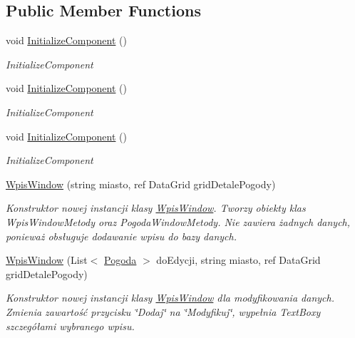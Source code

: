 \subsection*{Public Member Functions}
\begin{DoxyCompactItemize}
\item 
void \mbox{\hyperlink{class_projekt_1_1_wpis_window_a88a28d6acd2b4dc8de2f1272c9c23f8d}{Initialize\+Component}} ()
\begin{DoxyCompactList}\small\item\em Initialize\+Component \end{DoxyCompactList}\item 
void \mbox{\hyperlink{class_projekt_1_1_wpis_window_a88a28d6acd2b4dc8de2f1272c9c23f8d}{Initialize\+Component}} ()
\begin{DoxyCompactList}\small\item\em Initialize\+Component \end{DoxyCompactList}\item 
void \mbox{\hyperlink{class_projekt_1_1_wpis_window_a88a28d6acd2b4dc8de2f1272c9c23f8d}{Initialize\+Component}} ()
\begin{DoxyCompactList}\small\item\em Initialize\+Component \end{DoxyCompactList}\item 
\mbox{\hyperlink{class_projekt_1_1_wpis_window_ad267c83d80d8d13897f36cee34a87fdf}{Wpis\+Window}} (string miasto, ref Data\+Grid grid\+Detale\+Pogody)
\begin{DoxyCompactList}\small\item\em Konstruktor nowej instancji klasy \mbox{\hyperlink{class_projekt_1_1_wpis_window}{Wpis\+Window}}. Tworzy obiekty klas Wpis\+Window\+Metody oraz Pogoda\+Window\+Metody. Nie zawiera żadnych danych, ponieważ obsługuje dodawanie wpisu do bazy danych. \end{DoxyCompactList}\item 
\mbox{\hyperlink{class_projekt_1_1_wpis_window_aa1b8fd7af282aa4eb21e34a8540c548f}{Wpis\+Window}} (List$<$ \mbox{\hyperlink{class_projekt_1_1_baza_1_1_pogoda}{Pogoda}} $>$ do\+Edycji, string miasto, ref Data\+Grid grid\+Detale\+Pogody)
\begin{DoxyCompactList}\small\item\em Konstruktor nowej instancji klasy \mbox{\hyperlink{class_projekt_1_1_wpis_window}{Wpis\+Window}} dla modyfikowania danych. Zmienia zawartość przycisku \char`\"{}\+Dodaj\char`\"{} na \char`\"{}\+Modyfikuj\char`\"{}, wypełnia Text\+Boxy szczegółami wybranego wpisu. \end{DoxyCompactList}\end{DoxyCompactItemize}


